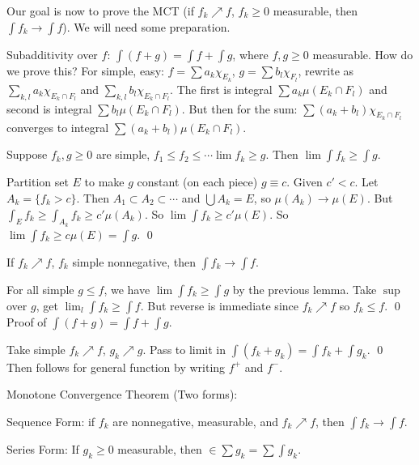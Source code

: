 Our goal is now to prove the MCT (if $f_k \nearrow f$, $f_k \geq 0$ measurable, then $\int f_k \to \int f$). We will need some preparation. 

Subadditivity over $f$: $\int (f+g) = \int f + \int g$, where $f,g \geq 0$ measurable. How do we prove this? For simple, easy: $f= \sum a_k \chi_{E_k}$, $g= \sum b_l \chi_{F_l}$, rewrite as $\sum_{k,l} a_k \chi_{E_k \cap F_l}$ and $\sum_{k,l} b_l \chi_{E_k \cap F_l}$. The first is integral $\sum a_k \mu(E_k \cap F_l)$ and second is integral $\sum b_l \mu(E_k \cap F_l)$. But then for the sum: $\sum (a_k+b_l) \chi_{E_k \cap F_l}$ converges to integral $\sum (a_k+b_l) \mu(E_k \cap F_l)$.


\begin{lem}
Suppose $f_k, g \geq 0$ are simple, $f_1 \leq f_2 \leq \cdots \lim f_k \geq g$. Then $\lim \int f_k \geq \int g$.
\end{lem}

\pf Partition set $E$ to make $g$ constant (on each piece) $g \equiv c$. Given $c' < c$. Let $A_k = \{f_k >c \}$. Then $A_1 \subset A_2 \subset \cdots$ and $\bigcup A_k = E$, so $\mu(A_k) \to \mu(E)$. But $\int_E f_k \geq \int_{A_k} f_k \geq c' \mu(A_k)$. So $\lim \int f_k \geq c' \mu(E)$. So $\lim \int f_k \geq c \mu(E)= \int g$. \qed \\


\begin{lem}
If $f_k \nearrow f$, $f_k$ simple nonnegative, then $\int f_k \to \int f$. 
\end{lem}

\pf For all simple $g \leq f$, we have $\lim \int f_k \geq \int g$ by the previous lemma. Take $\sup$ over $g$, get $\lim_l \int f_k \geq \int f$. But reverse is immediate since $f_k \nearrow f$ so $f_k \leq f$. \qed \\


Proof of $\int (f+g) = \int f + \int g$.

Take simple $f_k \nearrow f$, $g_k \nearrow g$. Pass to limit in $\int (f_k + g_k) = \int f_k + \int g_k$. \qed \\

Then follows for general function by writing $f^+$ and $f^-$. 


Monotone Convergence Theorem (Two forms):

Sequence Form: if $f_k$ are nonnegative, measurable, and $f_k \nearrow f$, then $\int f_k \to \int f$.

Series Form: If $g_k \geq 0$ measurable, then $\in \sum g_k = \sum \int g_k$.


